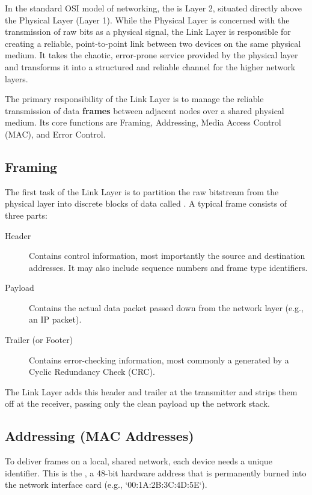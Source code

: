 In the standard OSI model of networking, the  is Layer 2, situated directly above the Physical Layer (Layer 1). While the Physical Layer is concerned with the transmission of raw bits as a physical signal, the Link Layer is responsible for creating a reliable, point-to-point link between two devices on the same physical medium. It takes the chaotic, error-prone service provided by the physical layer and transforms it into a structured and reliable channel for the higher network layers.

\begin{keyconcept}
    The primary responsibility of the Link Layer is to manage the reliable transmission of data \textbf{frames} between adjacent nodes over a shared physical medium. Its core functions are Framing, Addressing, Media Access Control (MAC), and Error Control.
\end{keyconcept}

\subsection{Framing}

The first task of the Link Layer is to partition the raw bitstream from the physical layer into discrete blocks of data called . A typical frame consists of three parts:
\begin{description}
    \item[Header] Contains control information, most importantly the source and destination addresses. It may also include sequence numbers and frame type identifiers.
    \item[Payload] Contains the actual data packet passed down from the network layer (e.g., an IP packet).
    \item[Trailer (or Footer)] Contains error-checking information, most commonly a  generated by a Cyclic Redundancy Check (CRC).
\end{description}
The Link Layer adds this header and trailer at the transmitter and strips them off at the receiver, passing only the clean payload up the network stack.

\subsection{Addressing (MAC Addresses)}

To deliver frames on a local, shared network, each device needs a unique identifier. This is the , a 48-bit hardware address that is permanently burned into the network interface card (e.g., `00:1A:2B:3C:4D:5E`).


